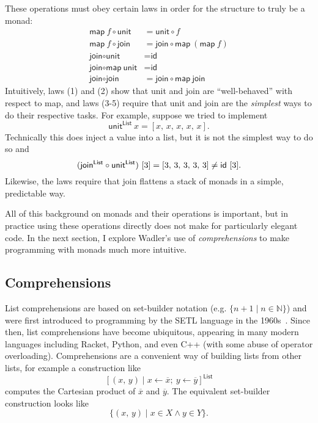 \documentclass[acmsmall, nonacm, screen]{acmart}
\newcommand{\unit}[2]{\textsf{unit}^{\textsf{#1}}~#2}
\begin{document}
These operations must obey certain laws in order for the structure to truly be a monad:
\begin{align}
  \textsf{map}~f \circ \textsf{unit} &= \textsf{unit} \circ f \\
  \textsf{map}~f \circ \textsf{join} &= \textsf{join} \circ \textsf{map}~(\textsf{map}~f) \\
  \textsf{join} \circ \textsf{unit} &= \textsf{id} \\
  \textsf{join} \circ \textsf{map}~\textsf{unit} &= \textsf{id} \\
  \textsf{join} \circ \textsf{join} &= \textsf{join} \circ \textsf{map}~\textsf{join}
\end{align}
Intuitively, laws (1) and (2) show that \textsf{unit} and \textsf{join} are ``well-behaved'' with
respect to \textsf{map}, and laws (3-5) require that \textsf{unit} and \textsf{join} are the {\em
simplest} ways to do their respective tasks. For example, suppose we tried to implement
\[ \unit{List}{x} = [x,\, x,\, x,\, x,\, x]. \]
Technically this does inject a value into a list, but it is not the simplest way to do so and
\[
  (\textsf{join}^{\textsf{List}} \circ \textsf{unit}^{\textsf{List}})~[3] = [3,\, 3,\, 3,\, 3,\, 3] \neq \textsf{id}~[3]. \\
\]
Likewise, the laws require that \textsf{join} flattens a stack of monads in a simple, predictable
way.

All of this background on monads and their operations is important, but in practice using these
operations directly does not make for particularly elegant code. In the next section, I explore
Wadler's use of {\em comprehensions} to make programming with monads much more intuitive.

\subsection{Comprehensions}
List comprehensions are based on set-builder notation (e.g. $\{n + 1 \mid n \in \mathbb{N}\}$)
and were first introduced to programming by the SETL language in the
1960s~\cite{schwartz2012programming}. Since then, list comprehensions have become ubiquitous,
appearing in many modern languages including Racket, Python, and even C++ (with some abuse of
operator overloading). Comprehensions are a convenient way of building lists from other lists,
for example a construction like
\[ [(x,\, y) \mid x \leftarrow \overline{x};\ y \leftarrow \overline{y}]^{\textsf{List}} \]
computes the Cartesian product of $\overline{x}$ and $\overline{y}$. The equivalent set-builder
construction looks like
\[ \{(x,\, y) \mid x \in X \wedge y \in Y\}. \]
\end{document}
